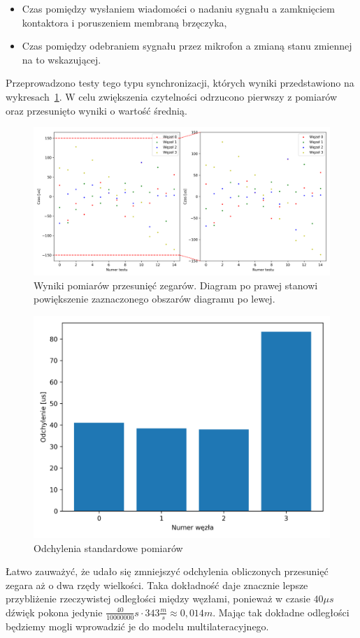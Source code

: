 \begin{itemize}
    \item Czas pomiędzy wysłaniem wiadomości o nadaniu sygnału a zamknięciem kontaktora i poruszeniem membraną brzęczyka,
    \item Czas pomiędzy odebraniem sygnału przez mikrofon a zmianą stanu zmiennej na to wskazującej.
\end{itemize}

Przeprowadzono testy tego typu synchronizacji, których wyniki przedstawiono na wykresach~\ref{pic:mic_sync}. W celu zwiększenia czytelności odrzucono pierwszy z pomiarów oraz przesunięto wyniki o wartość średnią.

\begin{figure}[H]
    \centering
    \includegraphics[width=\textwidth]{pics/mic_sync/offsets.png}
    \caption[Wyniki pomiarów przesunięć zegarów]{Wyniki pomiarów przesunięć zegarów. Diagram po prawej stanowi powiększenie zaznaczonego obszarów diagramu po lewej.}
    \label{pic:mic_sync}
\end{figure}

\begin{figure}[H]
    \centering
    \includegraphics[width=.49\textwidth]{pics/mic_sync/stddev_offsets.png}
    \caption{Odchylenia standardowe pomiarów}
    \label{pic:stddev_mic}
\end{figure}

Łatwo zauważyć, że udało się zmniejszyć odchylenia obliczonych przesunięć zegara aż o dwa rzędy wielkości. Taka dokładność daje znacznie lepsze przybliżenie rzeczywistej odległości między węzłami, ponieważ w czasie $40 \mu s$ dźwięk pokona jedynie $\frac{40}{10000000}s \cdot 343 \frac{m}{s} \approx 0,014m$. Mając tak dokładne odległości będziemy mogli wprowadzić je do modelu multilateracyjnego.

